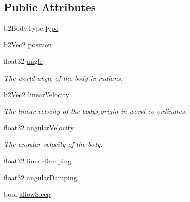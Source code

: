 \subsection*{Public Attributes}
\begin{DoxyCompactItemize}
\item 
b2\+Body\+Type \hyperlink{structb2BodyDef_a89cc3ad1873908042b002147b3861381}{type}
\item 
\hyperlink{structb2Vec2}{b2\+Vec2} \hyperlink{structb2BodyDef_a680cadc09ad6cf4b3366cbf0914c648b}{position}
\item 
\mbox{\label{structb2BodyDef_a564b16f4f8e9fcb5dda397e64aa9be6f}} 
float32 \hyperlink{structb2BodyDef_a564b16f4f8e9fcb5dda397e64aa9be6f}{angle}
\begin{DoxyCompactList}\small\item\em The world angle of the body in radians. \end{DoxyCompactList}\item 
\mbox{\label{structb2BodyDef_a25fa5aa78d93159c344241af95bec2bf}} 
\hyperlink{structb2Vec2}{b2\+Vec2} \hyperlink{structb2BodyDef_a25fa5aa78d93159c344241af95bec2bf}{linear\+Velocity}
\begin{DoxyCompactList}\small\item\em The linear velocity of the body\textquotesingle{}s origin in world co-\/ordinates. \end{DoxyCompactList}\item 
\mbox{\label{structb2BodyDef_add7809f7a29656b8c4b643ad8c2f34a9}} 
float32 \hyperlink{structb2BodyDef_add7809f7a29656b8c4b643ad8c2f34a9}{angular\+Velocity}
\begin{DoxyCompactList}\small\item\em The angular velocity of the body. \end{DoxyCompactList}\item 
float32 \hyperlink{structb2BodyDef_a728f6df3be7dedb331455105e3659d46}{linear\+Damping}
\item 
float32 \hyperlink{structb2BodyDef_a01b8dc8ad9f0962efef9e4a8e836feb6}{angular\+Damping}
\item 
bool \hyperlink{structb2BodyDef_a0765068172e521ed63cb34084c59c003}{allow\+Sleep}
\item 
\mbox{\label{structb2BodyDef_a17a8102638aac41e7ab94278651a45bd}} 

\end{DoxyCompactItemize}

